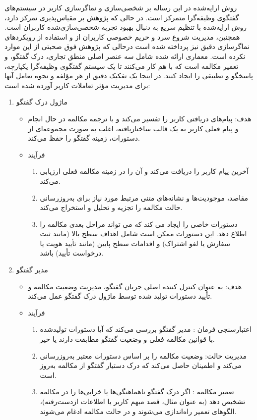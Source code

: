روش ارایه‌شده در این رساله بر شخصی‌سازی و نماگر‌سازی کاربر در سیستم‌های گفتگوی وظیفه‌گرا متمرکز است. در حالی که پژوهش%
\cite{bocklisch2024task}
 بر مقیاس‌پذیری تمرکز دارد، روش ارايه‌شده با تنظیم سریع به دنبال بهبود تجربه شخصی‌سازی‌شده کاربران است. همچنین، مدیریت شروع سرد و حریم خصوصی کاربران از و استفاده از رویکردهای نماگر‌سازی دقیق نیز پرداخته شده است درحالی که پژوهش فوق صحبتی از این موارد نکرده است.
\newline
معماری ارائه شده شامل سه عنصر اصلی منطق تجاری، درک گفتگو، و تعمیر مکالمه است که با هم کار می‌کنند تا یک سیستم گفتگوی وظیفه‌گرا یکپارچه، پاسخگو و تطبیقی ​​را ایجاد کنند. در اینجا یک تفکیک دقیق از هر مؤلفه و نحوه تعامل آنها برای مدیریت مؤثر تعاملات کاربر آورده شده است:

\begin{enumerate}
\item
ماژول درک گفتگو
\begin{itemize}
\item
هدف: پیام‌های دریافتی کاربر را تفسیر می‌کند و با ترجمه مکالمه در حال انجام و پیام فعلی کاربر به یک قالب ساختاریافته، اغلب به صورت مجموعه‌ای از دستورات، زمینه‌ گفتگو را حفظ می‌کند.
\item
فرآیند
\begin{enumerate}
\item
آخرین پیام کاربر را دریافت می‌کند و آن را در زمینه مکالمه فعلی ارزیابی می‌کند.
\item
مقاصد، موجودیت‌ها و نشانه‌های متنی مرتبط مورد نیاز برای به‌روزرسانی حالت مکالمه را تجزیه و تحلیل و استخراج می‌کند.
\item
دستورات خاصی را ایجاد می کند که می تواند مراحل بعدی مکالمه را اطلاع دهد. این دستورات ممکن است شامل اهداف سطح بالا (مانند ثبت سفارش یا لغو اشتراک) و اقدامات سطح پایین (مانند تأیید هویت یا درخواست تأیید) باشد.
\end{enumerate}

\end{itemize}

\item
مدیر گفتگو
\begin{itemize}
\item
هدف: به عنوان کنترل کننده اصلی جریان گفتگو، مدیریت وضعیت مکالمه و تأیید دستورات تولید شده توسط ماژول 
درک گفتگو%
 عمل می‌کند.
\item
فرآیند
\begin{enumerate}
\item
اعتبارسنجی فرمان%
: مدیر گفتگو بررسی می‌کند که آیا دستورات تولید‌شده با قوانین مکالمه فعلی و وضعیت گفتگو مطابقت دارند یا خیر.
\item
مدیریت حالت: وضعیت مکالمه را بر اساس دستورات معتبر به‌روزرسانی می‌کند و اطمینان حاصل می‌کند که درک دستیار گفتگو از مکالمه به‌روز است.
\item
تعمیر مکالمه%
: اگر درک گفتگو ناهماهنگی‌ها یا خرابی‌ها را در مکالمه تشخیص دهد (به عنوان مثال، قصد مبهم کاربر یا اطلاعات ازدست‌رفته)، الگوهای تعمیر راه‌اندازی می‌شوند و در حالت مکالمه ادغام می‌شوند.


\end{enumerate}
\end{itemize}
\end{enumerate}
